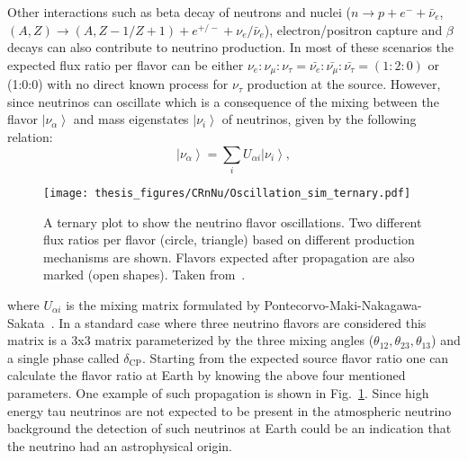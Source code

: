 Other interactions such as beta decay of neutrons and nuclei ($n \longrightarrow p + e^- + \bar{\nu}_{e} $, \\$(A, Z) \longrightarrow (A, Z-1/ Z+1) + e^{+/-} + \nu_{e} / \bar{\nu}_{e}$), electron/positron capture and $\beta$ decays can also contribute to neutrino production. In most of these scenarios the expected flux ratio per flavor can be either $ \nu_{e} : \nu_{\mu} : \nu_{\tau} = \bar{\nu_{e}}: \bar{\nu_{\mu}}: \bar{\nu_{\tau}} = (1:2:0) $ or (1:0:0) with no direct known process for $\nu_{\tau}$ production at the source. However, since neutrinos can oscillate which is a consequence of the mixing between the flavor  $\left| \nu_{\alpha} \right\rangle $ and mass eigenstates $\left| \nu_{i} \right\rangle $  of neutrinos, given by the following relation:
\begin{equation}
\left| \nu_{\alpha} \right\rangle  = \sum_i U_{\alpha i} \left| \nu_{i} \right\rangle,
\end{equation}
\begin{figure}[t!]
  \centering
  \texttt{[image: thesis\_figures/CRnNu/Oscillation\_sim\_ternary.pdf]}
  \caption{A ternary plot to show the neutrino flavor oscillations. Two different flux ratios per flavor (circle, triangle) based on different production mechanisms are shown. Flavors expected after propagation are also marked (open shapes). Taken from~\cite{Ahlers:ISAPP2022}.}
  \label{fig:Oscillation_ternary}
\end{figure}

where $U_{\alpha i}$ is the mixing matrix formulated by Pontecorvo-Maki-Nakagawa-Sakata~\cite{Pontecorvo:1957qd,10.1143/PTP.28.870}. In a standard case where three neutrino flavors are considered this matrix is a 3x3 matrix parameterized by the three mixing angles ($\theta_{12},\theta_{23},\theta_{13}$) and a single phase called $\delta_{\text{CP}}$. Starting from the expected source flavor ratio one can calculate the flavor ratio at Earth by knowing the above four mentioned parameters. One example of such propagation is shown in Fig.~\ref{fig:Oscillation_ternary}. Since high energy tau neutrinos are not expected to be present in the atmospheric neutrino background the detection of such neutrinos at Earth could be an indication that the neutrino had an astrophysical origin. 

